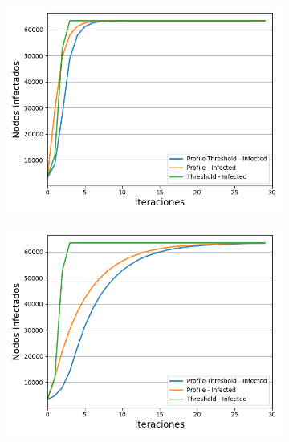 \documentclass{article}
\begin{document}
\begin{figure}[!tbp]
\begin{subfigure}[b]{0.5\textwidth}
		\includegraphics[width=\textwidth, height=\textwidth]{../Images/Fig 2 b).png}
		\caption{}
		\label{fig:f22}
	\end{subfigure}
	\begin{subfigure}[b]{0.5\textwidth}
		\includegraphics[width=\textwidth, height=\textwidth]{../Images/Fig 2 c).png}

\end{subfigure}
\end{figure}
\end{document}
